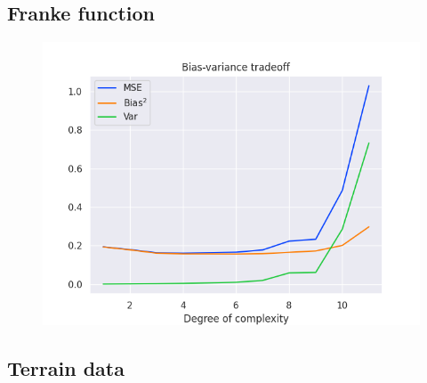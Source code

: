 \subsection{Franke function}

\begin{figure}[h!]
\centering
\includegraphics[width=1\linewidth]{project_1/images/bias_var_bootstrap.png}\label{plot_overfit}
\caption{}
\end{figure}


\subsection{Terrain data}

